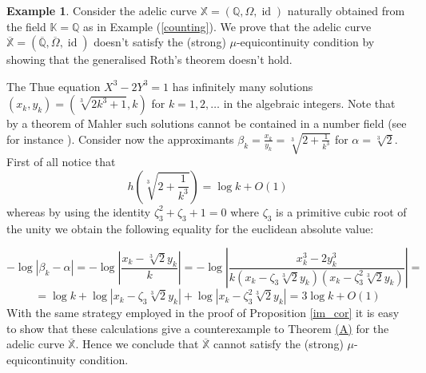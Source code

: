 \documentclass[10 pt,a4paper]{article}
\theoremstyle{plain}
\theoremstyle{definition}
\newtheorem{expl}[thm]{Example}
\theoremstyle{named}
\newcommand\bref[3][blue]{%
    \begingroup%
    \hypersetup{linkcolor=#1}%
    \hyperlink{#2}{#3}%
    \endgroup}
\DeclareMathOperator{\id}{id}
\begin{document}
\begin{expl}\label{Qbar}  Consider the adelic curve  $\mathbb X=(\mathbb Q,\Omega, \id)$ naturally obtained from the field $\mathbb K=\mathbb Q$ as in Example (\ref{counting}). We prove that the adelic curve $\overline{\mathbb X}=(\overline{\mathbb Q},\overline{\Omega}, \id)$ doesn't satisfy the (strong) $\mu$-equicontinuity condition by showing that the generalised Roth's theorem doesn't hold.  

The Thue equation $X^3-2Y^3=1$ has infinitely many solutions $(x_k,y_k)=\left (\sqrt[3]{2k^3+1}, k\right)$ for $k=1,2,\ldots$ in the algebraic integers. Note that by a theorem of Mahler  such solutions cannot be contained in a number field (see for instance \cite[Theorem 3.12]{Z}). Consider now the approximants $\beta_k=\frac{x_k}{y_k}=\sqrt[3]{2+\frac{1}{k^3}}$ for $\alpha=\sqrt[3]{2}$. First of all notice that
\[
h\left(\sqrt[3]{2+\frac{1}{k^3}}\right)=\log k+ O(1)
\]
whereas by using the identity $\zeta^2_3+\zeta_3+1=0$ where $\zeta_3$ is a primitive cubic root of the unity we obtain the following equality for the euclidean absolute value:

\[
-\log\left\vert \beta_k-\alpha\right\vert=-\log\left\vert \frac{x_k-\sqrt[3]{2}y_k}{k}\right\vert=-\log\left\vert\frac{x^3_k-2y^3_k}{k(x_k-\zeta_3\sqrt[3]{2}y_k)(x_k-\zeta^2_3\sqrt[3]{2}y_k)}\right\vert=
\]
 \[
 =\log k+\log\left\vert x_k-\zeta_3\sqrt[3]{2}y_k \right\vert + \log\left \vert x_k-\zeta^2_3\sqrt[3]{2}y_k \right\vert=3\log k+ O(1)
 \]
With the same strategy employed in the proof of Proposition \ref{im_cor}  it is easy to show that these calculations give a counterexample to Theorem \bref{thm:main}{(A)} for the adelic curve $\overline{\mathbb X}$. Hence we conclude that $\overline{\mathbb X}$ cannot satisfy the (strong) $\mu$-equicontinuity condition.
 
 
 
 
 

\end{expl}
\end{document}
